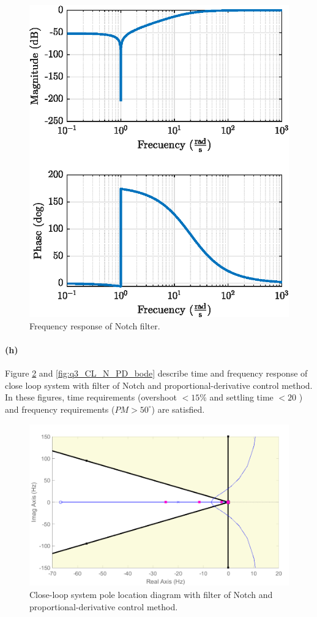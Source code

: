 \begin{figure}[h!]
	\centering
	\includegraphics{images/question3/q3_bode_N.eps}
	\caption{Frequency response of Notch filter.}
	\label{fig:notch_filter}
\end{figure}

\newpage
\paragraph{(h)} Figure \ref{fig:q3_CL_N_PD_rlocus} and \ref{fig:q3_CL_N_PD_bode} describe time and frequency response of close loop system with filter of Notch and proportional-derivative control method. In these figures, time requirements (overshoot $<15\%$ and settling time $<20$ ) and frequency requirements ($PM>50^{\circ}$) are satisfied. 


\begin{figure}[h!]
	\centering
	\includegraphics[width=.7\textwidth]{images/question3/sisotool_rlocus.pdf}
	\caption{Close-loop system pole location diagram with filter of Notch and proportional-derivative control method.}
	\label{fig:q3_CL_N_PD_rlocus}
\end{figure}

